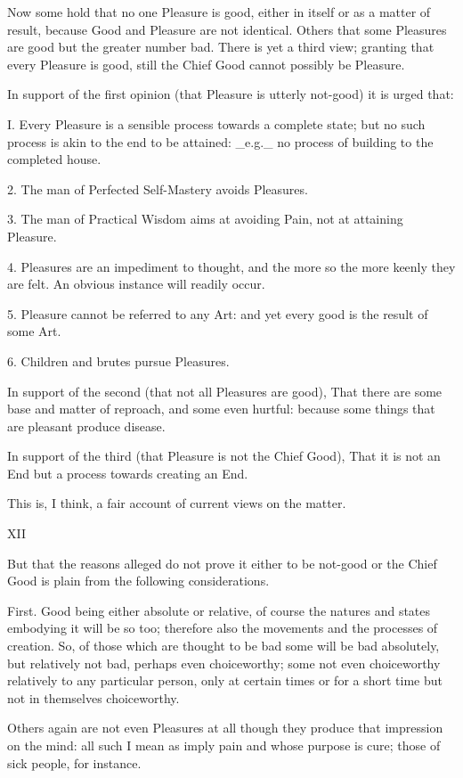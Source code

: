 Now some hold that no one Pleasure is good, either in itself or as a
matter of result, because Good and Pleasure are not identical. Others
that some Pleasures are good but the greater number bad. There is yet a
third view; granting that every Pleasure is good, still the Chief Good
cannot possibly be Pleasure.

In support of the first opinion (that Pleasure is utterly not-good) it
is urged that:

I. Every Pleasure is a sensible process towards a complete state; but
no such process is akin to the end to be attained: _e.g._ no process of
building to the completed house.

2. The man of Perfected Self-Mastery avoids Pleasures.

3. The man of Practical Wisdom aims at avoiding Pain, not at attaining
Pleasure.

4. Pleasures are an impediment to thought, and the more so the more
keenly they are felt. An obvious instance will readily occur.

5. Pleasure cannot be referred to any Art: and yet every good is the
result of some Art.

6. Children and brutes pursue Pleasures.

In support of the second (that not all Pleasures are good), That there
are some base and matter of reproach, and some even hurtful: because
some things that are pleasant produce disease.

In support of the third (that Pleasure is not the Chief Good), That it
is not an End but a process towards creating an End.

This is, I think, a fair account of current views on the matter.

XII


But that the reasons alleged do not prove it either to be not-good or
the Chief Good is plain from the following considerations.

First. Good being either absolute or relative, of course the natures and
states embodying it will be so too; therefore also the movements and the
processes of creation. So, of those which are thought to be bad
some will be bad absolutely, but relatively not bad, perhaps even
choiceworthy; some not even choiceworthy relatively to any particular
person, only at certain times or for a short time but not in themselves
choiceworthy.

Others again are not even Pleasures at all though they produce that
impression on the mind: all such I mean as imply pain and whose purpose
is cure; those of sick people, for instance.

